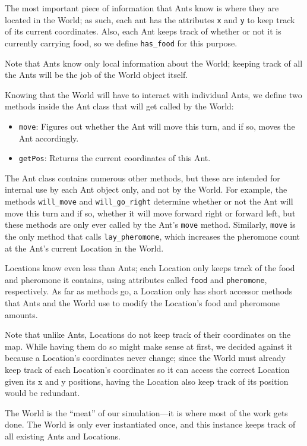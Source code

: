 The most important piece of information that Ants know is where they are located in the World; as such, each ant has the attributes \texttt{x} and \texttt{y} to keep track of its current coordinates. Also, each Ant keeps track of whether or not it is currently carrying food, so we define \texttt{has\_food} for this purpose.

Note that Ants know only local information about the World; keeping track of all the Ants will be the job of the World object itself.

Knowing that the World will have to interact with individual Ants, we define two methods inside the Ant class that will get called by the World:

\begin{itemize}
 \item \texttt{move}: Figures out whether the Ant will move this turn, and if so, moves the Ant accordingly.
 \item \texttt{getPos}: Returns the current coordinates of this Ant.
\end{itemize}

The Ant class contains numerous other methods, but these are intended for internal use by each Ant object only, and not by the World. For example, the methods \texttt{will\_move} and \texttt{will\_go\_right} determine whether or not the Ant will move this turn and if so, whether it will move forward right or forward left, but these methods are only ever called by the Ant's \texttt{move} method. Similarly, \texttt{move} is the only method that calls \texttt{lay\_pheromone}, which increases the pheromone count at the Ant's current Location in the World.

Locations know even less than Ants; each Location only keeps track of the food and pheromone it contains, using attributes called \texttt{food} and \texttt{pheromone}, respectively. As far as methods go, a Location only has short accessor methods that Ants and the World use to modify the Location's food and pheromone amounts.

Note that unlike Ants, Locations do not keep track of their coordinates on the map. While having them do so might make sense at first, we decided against it because a Location's coordinates never change; since the World must already keep track of each Location's coordinates so it can access the correct Location given its x and y positions, having the Location also keep track of its position would be redundant.

The World is the ``meat'' of our simulation---it is where most of the work gets done. The World is only ever instantiated once, and this instance keeps track of all existing Ants and Locations. 

